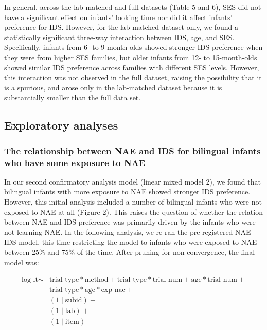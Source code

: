 \documentclass[
  english,
  ,man,floatsintext]{apa6}
\begin{document}
In general, across the lab-matched and full datasets (Table 5 and 6), SES did not have a significant effect on infants' looking time nor did it affect infants' preference for IDS. However, for the lab-matched dataset only, we found a statistically significant three-way interaction between IDS, age, and SES. Specifically, infants from 6- to 9-month-olds showed stronger IDS preference when they were from higher SES families, but older infants from 12- to 15-month-olds showed similar IDS preference across families with different SES levels. However, this interaction was not observed in the full dataset, raising the possibility that it is a spurious, and arose only in the lab-matched dataset because it is substantially smaller than the full data set.

\hypertarget{exploratory-analyses}{%
\subsection{Exploratory analyses}\label{exploratory-analyses}}

\hypertarget{the-relationship-between-nae-and-ids-for-bilingual-infants-who-have-some-exposure-to-nae}{%
\subsubsection{The relationship between NAE and IDS for bilingual infants who have some exposure to NAE}\label{the-relationship-between-nae-and-ids-for-bilingual-infants-who-have-some-exposure-to-nae}}

In our second confirmatory analysis model (linear mixed model 2), we found that bilingual infants with more exposure to NAE showed stronger IDS preference. However, this initial analysis included a number of bilingual infants who were not exposed to NAE at all (Figure 2). This raises the question of whether the relation between NAE and IDS preference was primarily driven by the infants who were not learning NAE. In the following analysis, we re-ran the pre-registered NAE-IDS model, this time restricting the model to infants who were exposed to NAE between 25\% and 75\% of the time. After pruning for non-convergence, the final model was:

\begin{equation}
\begin{split}
\text{log lt} \sim & \text{trial type} * \text{method} + \text{trial type} * \text{trial num} + \text{age} * \text{trial num} + \\
& \text{trial type} * \text{age} * \text{exp nae} + \\
& (1 \mid \text{subid}) + \\
& (1 \mid \text{lab}) + \\
& (1 \mid \text{item})
\end{split}
\end{equation}
\end{document}
